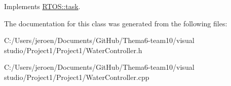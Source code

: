 Implements \hyperlink{class_r_t_o_s_1_1task_addc6d52f8792ddba1158d7ae5ef0037d}{R\+T\+O\+S\+::task}.



The documentation for this class was generated from the following files\+:\begin{DoxyCompactItemize}
\item 
C\+:/\+Users/jeroen/\+Documents/\+Git\+Hub/\+Thema6-\/team10/visual studio/\+Project1/\+Project1/Water\+Controller.\+h\item 
C\+:/\+Users/jeroen/\+Documents/\+Git\+Hub/\+Thema6-\/team10/visual studio/\+Project1/\+Project1/Water\+Controller.\+cpp\end{DoxyCompactItemize}
